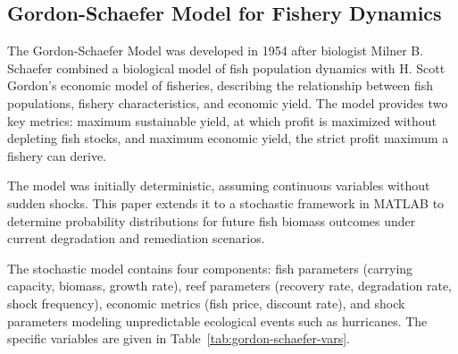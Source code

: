\documentclass[10pt,letterpaper]{article}
\begin{document}
\subsection{Gordon-Schaefer Model for Fishery Dynamics}

The Gordon-Schaefer Model was developed in 1954 after biologist Milner B. Schaefer combined a biological model of fish population dynamics with H. Scott Gordon's economic model of fisheries, describing the relationship between fish populations, fishery characteristics, and economic yield. The model provides two key metrics: maximum sustainable yield, at which profit is maximized without depleting fish stocks, and maximum economic yield, the strict profit maximum a fishery can derive.

The model was initially deterministic, assuming continuous variables without sudden shocks. This paper extends it to a stochastic framework in MATLAB to determine probability distributions for future fish biomass outcomes under current degradation and remediation scenarios.

The stochastic model contains four components: fish parameters (carrying capacity, biomass, growth rate), reef parameters (recovery rate, degradation rate, shock frequency), economic metrics (fish price, discount rate), and shock parameters modeling unpredictable ecological events such as hurricanes. The specific variables are given in Table~\ref{tab:gordon-schaefer-vars}.
\end{document}
